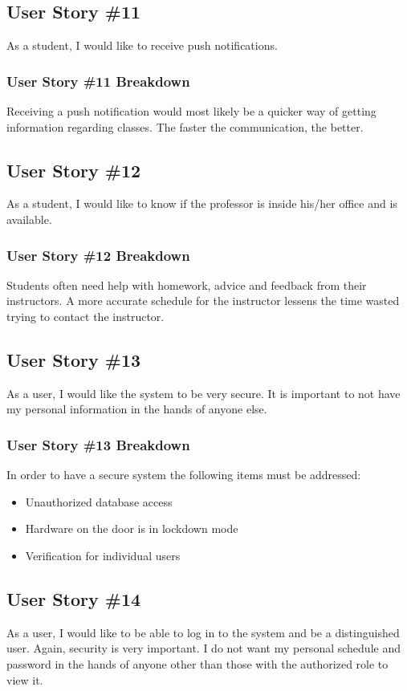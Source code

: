 \subsection{User Story \#11} 
As a student, I would like to receive push notifications.
\subsubsection{User Story \#11 Breakdown}
Receiving a push notification would most likely be a quicker way of getting information regarding classes. The faster the communication, the better.

\subsection{User Story \#12} 
As a student, I would like to know if the professor is inside his/her office and is available.  
\subsubsection{User Story \#12 Breakdown}
Students often need help with homework, advice and feedback from their instructors.  A more accurate schedule for the instructor lessens the time wasted trying to contact the instructor.

\subsection{User Story \#13} 
As a user, I would like the system to be very secure.  It is important to not have my personal information in the hands of anyone else.
\subsubsection{User Story \#13 Breakdown}
In order to have a secure system the following items must be addressed:
\begin{itemize}
\item Unauthorized database access
\item Hardware on the door is in lockdown mode
\item Verification for individual users
\end{itemize}

\subsection{User Story \#14} 
As a user, I would like to be able to log in to the system and be a distinguished user.  Again, security is very important.  I do not want my personal schedule and password in the hands of anyone other than those with the authorized role to view it.
